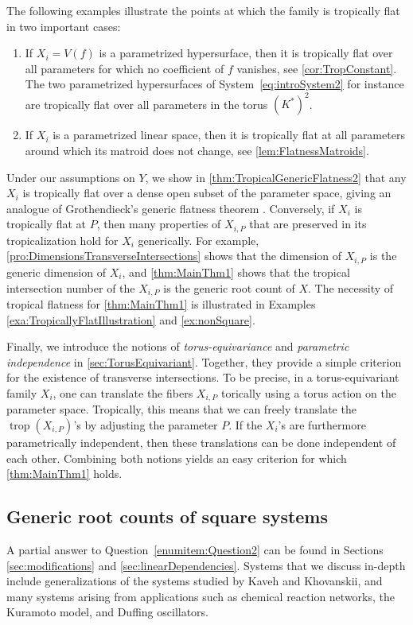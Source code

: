 \documentclass[12pt,reqno,a4paper]{amsart}
\theoremstyle{theoremstyle}
\theoremstyle{examplestyle}
\theoremstyle{algorithmstyle}
\DeclareMathOperator{\trop}{trop}
\begin{document}
The following examples illustrate the points at which the family is tropically flat in two important cases:
\begin{enumerate}
\item If $X_{i}=V(f)$ is a parametrized hypersurface, then it is tropically flat over all parameters for which no coefficient of $f$ vanishes, see \cref{cor:TropConstant}.  The two parametrized hypersurfaces of System~\eqref{eq:introSystem2} for instance are tropically flat over all parameters in the torus $(K^\ast)^2$.
\item If $X_i$ is a parametrized linear space, then it is tropically flat at all parameters around which its matroid does not change, see \cref{lem:FlatnessMatroids}.
\end{enumerate}
Under our assumptions on $Y$, we show in \cref{thm:TropicalGenericFlatness2} that any $X_{i}$ is tropically flat over a dense open subset of the parameter space, giving an analogue of Grothendieck's generic flatness theorem \cite[Th\'{e}or\`{e}me 6.9.1]{EGA42} \cite[\href{https://stacks.math.columbia.edu/tag/052A}{Proposition 052A}]{stacks-project}. Conversely, if $X_{i}$ is tropically flat at $P$, then many properties of $X_{i,P}$ that are preserved in its tropicalization hold for $X_i$ generically.
  For example, \cref{pro:DimensionsTransverseIntersections} shows that the dimension of $X_{i,P}$ is the generic dimension of $X_i$, and \cref{thm:MainThm1} shows that the tropical intersection number of the $X_{i,P}$ is the generic root count of $X$. %
The necessity of tropical flatness for \cref{thm:MainThm1} is illustrated in Examples
\ref{exa:TropicallyFlatIllustration} and \ref{ex:nonSquare}.

Finally, we introduce the notions of \emph{torus-equivariance} and \emph{parametric independence} in \cref{sec:TorusEquivariant}.  Together, they provide a simple criterion for the existence of transverse intersections.  To be precise, in a torus-equivariant family $X_i$, one can translate the fibers $X_{i,P}$ torically using a torus action on the parameter space. Tropically, this means that we can freely translate the $\trop(X_{i,P})$'s by adjusting the parameter $P$.  If the $X_i$'s are furthermore parametrically independent, then these translations can be done independent of each other.  Combining both notions yields an easy criterion for which \cref{thm:MainThm1} holds.

\subsection{Generic root counts of square systems}\label{sec:IntroKQ2}
A partial answer to Question~\ref{enumitem:Question2} can be found in Sections \ref{sec:modifications} and \ref{sec:linearDependencies}.  Systems that we discuss in-depth include  generalizations of the systems studied by Kaveh and Khovanskii, and many systems arising from applications such as chemical reaction networks, the Kuramoto model, and Duffing oscillators.
\end{document}
